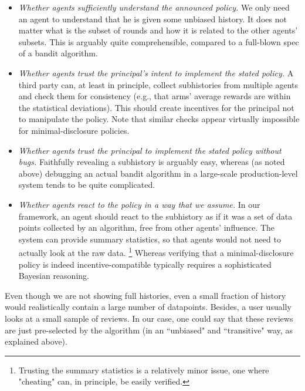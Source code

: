 \begin{itemize}

\item \emph{Whether agents sufficiently understand the announced policy.} We only need an agent to understand that he is given some unbiased history. It does not matter what is the subset of rounds and how it is related to the other agents' subsets. This is arguably quite comprehensible, compared to a full-blown spec of a bandit algorithm.

\item \emph{Whether agents trust the principal's intent to implement the stated policy.} A third party can, at least in principle, collect subhistories from multiple agents and check them for consistency (e.g., that arms' average rewards are within the statistical deviations). This should create incentives for the principal not to manipulate the policy. Note that similar checks appear virtually impossible for minimal-disclosure policies.
     

\item \emph{Whether agents trust the principal to implement the stated policy without bugs.}
    Faithfully revealing a subhistory is arguably easy, whereas (as noted above) debugging an actual bandit algorithm in a large-scale production-level system tends to be quite complicated.

\item \emph{Whether agents react to the policy in a way that we assume.}
In our framework, an agent should react to the subhistory as if it was a set of data points collected by an algorithm, free from other agents' influence. The system can provide summary statistics, so that agents would not need to actually look at the raw data.%
\footnote{Trusting the summary statistics is a relatively minor issue, one where "cheating" can, in principle, be easily verified.}
Whereas verifying that a minimal-disclosure policy is indeed incentive-compatible typically requires a sophisticated Bayesian reasoning.

\end{itemize}

Even though we are not showing full histories, even a small fraction of history would realistically contain a large number of datapoints. Besides, a user usually looks at a small sample of reviews. In our case, one could say that these reviews are just pre-selected by the algorithm (in an ``unbiased" and ``transitive" way, as explained above).

